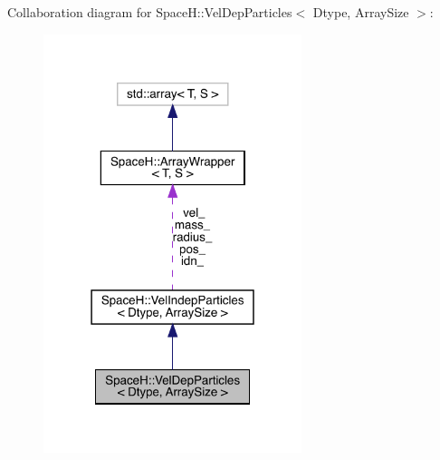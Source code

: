 Collaboration diagram for SpaceH\+:\+:Vel\+Dep\+Particles$<$ Dtype, Array\+Size $>$\+:
\nopagebreak
\begin{figure}[H]
\begin{center}
\leavevmode
\includegraphics[width=214pt]{class_space_h_1_1_vel_dep_particles__coll__graph}
\end{center}
\end{figure}
